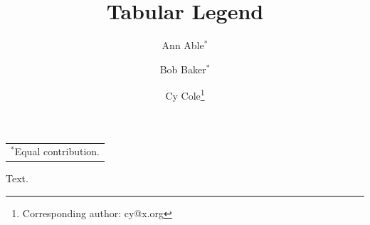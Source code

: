\documentclass{article}
\title{Tabular Legend}
\author{Ann Able$^{*}$ \and Bob Baker$^{*}$ \and Cy Cole\thanks{Corresponding author: cy@x.org}}
\date{}
\begin{document}
\maketitle
\begin{center}\begin{tabular}{l}$^{*}$Equal contribution.\end{tabular}\end{center}
Text.
\end{document}
